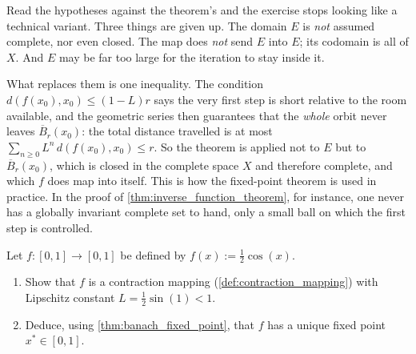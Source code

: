\begin{remark}
\label{rem:local_banach_fixed_point}
Read the hypotheses against the theorem's and the exercise stops looking like a technical variant.
Three things are given up. The domain $E$ is \emph{not} assumed complete, nor even closed. The map
does \emph{not} send $E$ into $E$; its codomain is all of $X$. And $E$ may be far too large for
the iteration to stay inside it.

What replaces them is one inequality. The condition $d(f(x_0),x_0) \le (1-L)r$ says the very first
step is short relative to the room available, and the geometric series then guarantees that the
\emph{whole} orbit never leaves $\overline{B}_r(x_0)$: the total distance travelled is at most
$\sum_{n\ge0}L^n\,d(f(x_0),x_0) \le r$. So the theorem is applied not to $E$ but to
$\overline{B}_r(x_0)$, which is closed in the complete space $X$ and therefore complete, and which
$f$ does map into itself. This is how the fixed-point theorem is used in practice. In the proof
of \cref{thm:inverse_function_theorem}, for instance, one never has a globally invariant complete
set to hand, only a small ball on which the first step is controlled.
\end{remark}

\begin{aiexercise}
\label{ex:ai_contraction_cos}
Let $f \colon [0,1] \to [0,1]$ be defined by $f(x) := \frac{1}{2}\cos(x)$.
\begin{enumerate}[label=\textbf{(\alph*)}]
  \item Show that $f$ is a contraction mapping (\cref{def:contraction_mapping}) with Lipschitz
    constant $L = \frac{1}{2}\sin(1) < 1$.
  \item Deduce, using \cref{thm:banach_fixed_point}, that $f$ has a unique fixed point
    $x^* \in [0,1]$.
\end{enumerate}
\end{aiexercise}

